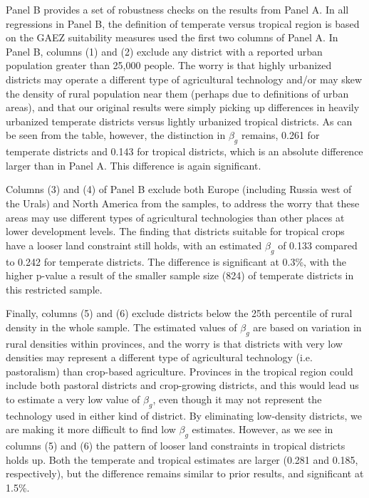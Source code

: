 \documentclass[11pt]{article}
\begin{document}
Panel B provides a set of robustness checks on the results from Panel A. In all regressions in Panel B, the definition of temperate versus tropical region is based on the GAEZ suitability measures used the first two columns of Panel A. In Panel B, columns (1) and (2) exclude any district with a reported urban population greater than 25,000 people. The worry is that highly urbanized districts may operate a different type of agricultural technology and/or may skew the density of rural population near them (perhaps due to definitions of urban areas), and that our original results were simply picking up differences in heavily urbanized temperate districts versus lightly urbanized tropical districts. As can be seen from the table, however, the distinction in $\beta_g$ remains, 0.261 for temperate districts and 0.143 for tropical districts, which is an absolute difference larger than in Panel A. This difference is again significant.

Columns (3) and (4) of Panel B exclude both Europe (including Russia west of the Urals) and North America from the samples, to address the worry that these areas may use different types of agricultural technologies than other places at lower development levels. The finding that districts suitable for tropical crops have a looser land constraint still holds, with an estimated $\beta_g$ of 0.133 compared to 0.242 for temperate districts. The difference is significant at 0.3\%, with the higher p-value a result of the smaller sample size (824) of temperate districts in this restricted sample.

Finally, columns (5) and (6) exclude districts below the 25th percentile of rural density in the whole sample. The estimated values of $\beta_g$ are based on variation in rural densities within provinces, and the worry is that districts with very low densities may represent a different type of agricultural technology (i.e. pastoralism) than crop-based agriculture. Provinces in the tropical region could include both pastoral districts and crop-growing districts, and this would lead us to estimate a very low value of $\beta_g$, even though it may not represent the technology used in either kind of district. By eliminating low-density districts, we are making it more difficult to find low $\beta_g$ estimates. However, as we see in columns (5) and (6) the pattern of looser land constraints in tropical districts holds up. Both the temperate and tropical estimates are larger (0.281 and 0.185, respectively), but the difference remains similar to prior results, and significant at 1.5\%.
\end{document}
